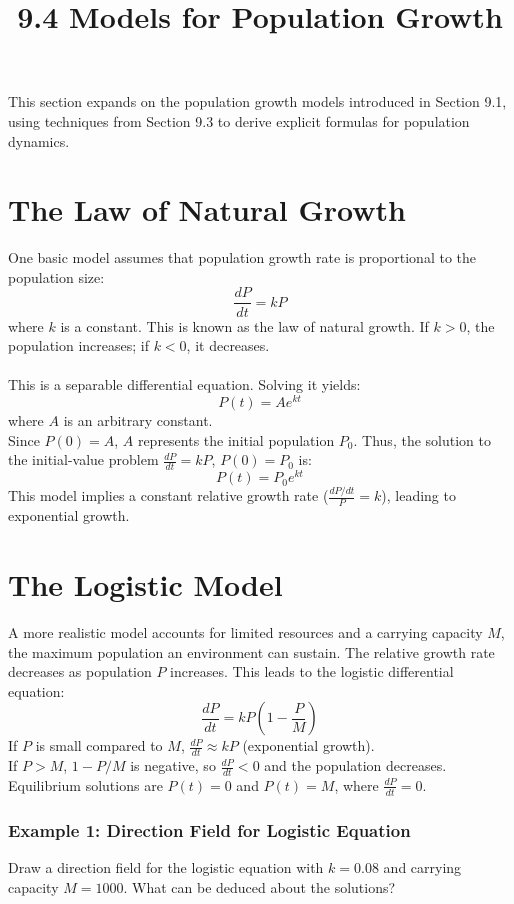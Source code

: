 \documentclass{article}
\title{9.4 Models for Population Growth}
\author{}
\date{}
\begin{document}
\maketitle

This section expands on the population growth models introduced in Section 9.1, using techniques from Section 9.3 to derive explicit formulas for population dynamics.

\section*{The Law of Natural Growth}

One basic model assumes that population growth rate is proportional to the population size:
\[\frac{dP}{dt} = kP\]
where $k$ is a constant.
This is known as the law of natural growth. If $k>0$, the population increases; if $k<0$, it decreases.\\
\\This is a separable differential equation. Solving it yields:
\[P(t) = A e^{kt}\]
where $A$ is an arbitrary constant.\\
Since $P(0)=A$, $A$ represents the initial population $P_0$.
Thus, the solution to the initial-value problem $\frac{dP}{dt} = kP$, $P(0)=P_0$ is:
\[P(t) = P_0 e^{kt}\]
This model implies a constant relative growth rate ($\frac{dP/dt}{P} = k$), leading to exponential growth.

\section*{The Logistic Model}

A more realistic model accounts for limited resources and a carrying capacity $M$, the maximum population an environment can sustain. 
The relative growth rate decreases as population $P$ increases. 
This leads to the logistic differential equation:
\[\frac{dP}{dt} = kP\left(1 - \frac{P}{M}\right)\]
If $P$ is small compared to $M$, $\frac{dP}{dt} \approx kP$ (exponential growth).
\\If $P > M$, $1 - P/M$ is negative, so $\frac{dP}{dt} < 0$ and the population decreases.
\\Equilibrium solutions are $P(t) = 0$ and $P(t) = M$, where $\frac{dP}{dt} = 0$.

\subsubsection*{Example 1: Direction Field for Logistic Equation}
Draw a direction field for the logistic equation with $k = 0.08$ and carrying capacity $M = 1000$. 
What can be deduced about the solutions?
\end{document}
